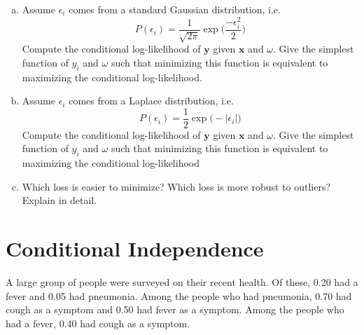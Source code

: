 \documentclass[11pt]{article}
\begin{document}
\begin{enumerate}[(a)]
\item Assume $\epsilon_i$ comes from a standard Gaussian distribution, i.e.
$$P(\epsilon_i) =  \frac{1}{\sqrt{2\pi}}\exp{\Big(\frac{-\epsilon_i^2}{2}\Big)}$$
Compute the conditional log-likelihood of $\textbf{y}$ given $\textbf{x}$ and $\omega$.  Give the simplest function of $y_i$ and $\omega$ such that minimizing this function is equivalent to maximizing the conditional log-likelihood. \\
\begin{answertext}{9cm}{}

  
\end{answertext} 

\item Assume $\epsilon_i$ comes from a Laplace distribution, i.e.
$$P(\epsilon_i) =  \frac{1}{2}\exp{\Big(-|\epsilon_i|\Big)}$$
Compute the conditional log-likelihood of $\textbf{y}$ given $\textbf{x}$ and $\omega$.
Give the simplest function of $y_i$ and $\omega$ such that minimizing this function is equivalent to maximizing the conditional log-likelihood \\
\begin{answertext}{9cm}{}

  
\end{answertext} 

\item Which loss is easier to minimize?  Which loss is more robust to outliers?  Explain in detail.\\
\begin{answertext}{9cm}{}

  
\end{answertext} 

\end{enumerate}

\pagebreak
\section{Conditional Independence}
A large group of people were surveyed on their recent health. Of these, 0.20 had a fever and 0.05 had pneumonia. Among the people who had pneumonia, 0.70 had cough as a symptom and 0.50 had fever as a symptom. Among the people who had a fever, 0.40 had cough as a symptom.
\end{document}
